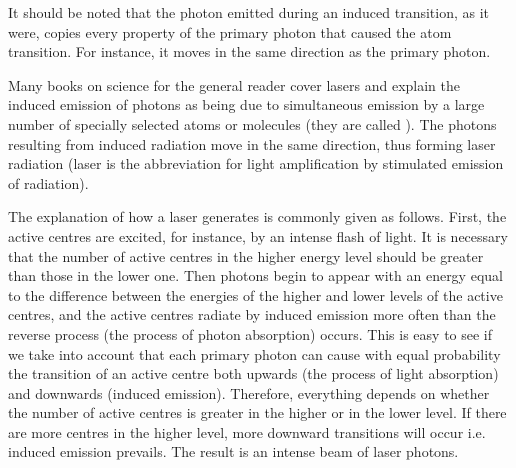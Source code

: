It should be noted that the photon emitted during an induced
transition, as it were, copies every property of the primary photon that
caused the atom transition. For instance, it moves in the same direction
as the primary photon.


 Many books on science for the general reader cover lasers and explain the induced emission of photons
as being due to simultaneous emission by a large number of specially
selected atoms or molecules (they are called ). The photons resulting from induced radiation move in the same direction, thus
forming laser radiation (laser is the abbreviation for light amplification
by stimulated emission of radiation).

The explanation of how a laser generates is commonly given as
follows. First, the active centres are excited, for instance, by an intense
flash of light. It is necessary that the number of active centres in the higher
energy level should be greater than those in the lower one. Then
photons begin to appear with an energy equal to the difference between
the energies of the higher and lower levels of the active centres, and the
active centres radiate by induced emission more often than the reverse
process (the process of photon absorption) occurs. This is easy to see if
we take into account that each primary photon can cause with equal
probability the transition of an active centre both upwards (the process
of light absorption) and downwards (induced emission). Therefore,
everything depends on whether the number of active centres is greater
in the higher or in the lower level. If there are more centres in the higher
level, more downward transitions will occur i.e. induced emission
prevails. The result is an intense beam of laser photons.


